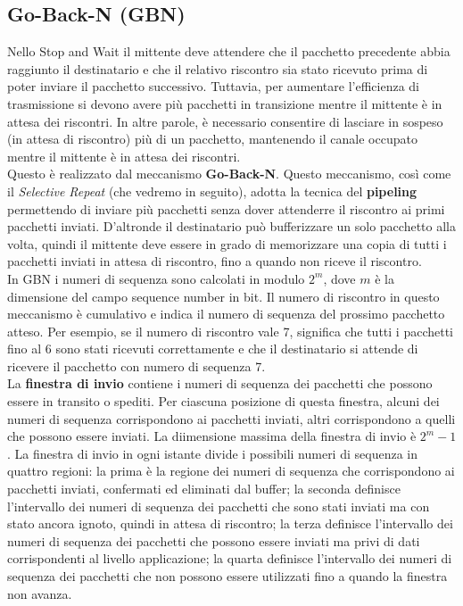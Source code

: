 \documentclass[12pt]{report}
\begin{document}
	\subsection{Go-Back-N (GBN)}
	Nello Stop and Wait il mittente deve attendere che il pacchetto precedente abbia raggiunto il destinatario e che il relativo riscontro sia stato ricevuto prima di poter inviare il pacchetto successivo. Tuttavia, per aumentare l'efficienza di trasmissione si devono avere più pacchetti in transizione mentre il mittente è in attesa dei riscontri. In altre parole, è necessario consentire di lasciare in sospeso (in attesa di riscontro) più di un pacchetto, mantenendo il canale occupato mentre il mittente è in attesa dei riscontri. 
	\vspace{\baselineskip}\\
	Questo è realizzato dal meccanismo \textbf{Go-Back-N}. Questo meccanismo, così come il \textit{Selective Repeat} (che vedremo in seguito), adotta la tecnica del \textbf{pipeling} permettendo di inviare più pacchetti senza dover attenderre il riscontro ai primi pacchetti inviati. D'altronde il destinatario può bufferizzare un solo pacchetto alla volta, quindi il mittente deve essere in grado di memorizzare una copia di tutti i pacchetti inviati in attesa di riscontro, fino a quando non riceve il riscontro.
	\vspace{\baselineskip}\\
	In GBN i numeri di sequenza sono calcolati in modulo $2^m$, dove $m$ è la dimensione del campo sequence number in bit. Il numero di riscontro in questo meccanismo è cumulativo e indica il numero di sequenza del prossimo pacchetto atteso. Per esempio, se il numero di riscontro vale 7, significa che tutti i pacchetti fino al 6 sono stati ricevuti correttamente e che il destinatario si attende di ricevere il pacchetto con numero di sequenza 7.
	\vspace{\baselineskip}\\
	La \textbf{finestra di invio} contiene i numeri di sequenza dei pacchetti che possono essere in transito o spediti. Per ciascuna posizione di questa finestra, alcuni dei numeri di sequenza corrispondono ai pacchetti inviati, altri corrispondono a quelli che possono essere inviati. La diimensione massima della finestra di invio è $2^m - 1$. La finestra di invio in ogni istante divide i possibili numeri di sequenza in quattro regioni: la prima è la regione dei numeri di sequenza che corrispondono ai pacchetti inviati, confermati ed eliminati dal buffer; la seconda definisce l'intervallo dei numeri di sequenza dei pacchetti che sono stati inviati ma con stato ancora ignoto, quindi in attesa di riscontro; la terza definisce l'intervallo dei numeri di sequenza dei pacchetti che possono essere inviati ma privi di dati corrispondenti al livello applicazione; la quarta definisce l'intervallo dei numeri di sequenza dei pacchetti che non possono essere utilizzati fino a quando la finestra non avanza.	
\end{document}

